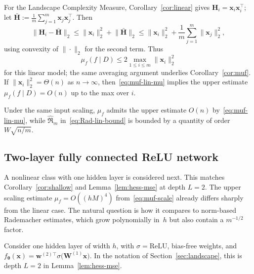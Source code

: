 \documentclass[10pt,letterpaper]{article}
\theoremstyle{definition}
\begin{document}
For the Landscape Complexity Measure, Corollary~\ref{cor:linear} gives $\mathbf{H}_i=\mathbf{x}_i\mathbf{x}_i^{\top}$; let $\bar{\mathbf{H}}:=\frac{1}{m}\sum_{j=1}^{m}\mathbf{x}_j\mathbf{x}_j^{\top}$.
Then
\begin{equation}\label{eq:muf-lin-bound}
  \bigl\|\mathbf{H}_i-\bar{\mathbf{H}}\bigr\|_2
  \le \|\mathbf{x}_i\|_2^2 + \bigl\|\bar{\mathbf{H}}\bigr\|_2
  \le \|\mathbf{x}_i\|_2^2 + \frac{1}{m}\sum_{j=1}^{m}\|\mathbf{x}_j\|_2^2 ,
\end{equation}
using convexity of $\|\cdot\|_2$ for the second term.
Thus
\begin{equation}\label{eq:muf-lin-mu}
  \mu_f(f\mid D)
  \le 2\max_{1\le i\le m}\|\mathbf{x}_i\|_2^2
\end{equation}
for this linear model; the same averaging argument underlies Corollary~\ref{cor:muf}.
If $\|\mathbf{x}_i\|_2^2=\Theta(n)$ as $n\to\infty$, then~\eqref{eq:muf-lin-mu} implies the upper estimate $\mu_f(f\mid D)=O(n)$ up to the max over $i$.

Under the same input scaling, $\mu_f$ admits the upper estimate $O(n)$ by~\eqref{eq:muf-lin-mu}, while $\hat{\mathfrak{R}}_m$ in~\eqref{eq:Rad-lin-bound} is bounded by a quantity of order $W\sqrt{n/m}$.

\subsection{Two-layer fully connected ReLU network}\label{subsec:two-layer-comp}

A nonlinear class with one hidden layer is considered next. This matches Corollary~\ref{cor:shallow} and Lemma~\ref{lem:hess-mse} at depth $L=2$.
The upper scaling estimate $\mu_f=O((hM)^4)$ from~\eqref{eq:muf-scale} already differs sharply from the linear case. The natural question is how it compares to norm-based Rademacher estimates, which grow polynomially in~$h$ but also contain a $m^{-1/2}$ factor.

Consider one hidden layer of width $h$, with $\sigma=\mathrm{ReLU}$, bias-free weights, and
$f_{\boldsymbol{\theta}}(\mathbf{x})=\mathbf{w}^{(2)\top}\sigma\bigl(\mathbf{W}^{(1)}\mathbf{x}\bigr)$.
In the notation of Section~\ref{sec:landscape}, this is depth $L=2$ in Lemma~\ref{lem:hess-mse}.
\end{document}
